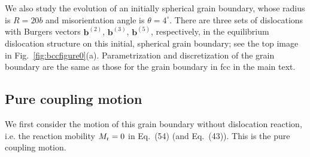 \documentclass[smallextended]{svjour3}
\begin{document}
We also study the evolution of an initially spherical grain boundary, whose radius is $R=20b$ and misorientation angle  is $\theta = 4^\circ $.  There are three sets of dislocations with Burgers vectors $\mathbf b^{(2)}$, $\mathbf{b}^{(3)}$, $\mathbf{b}^{(5)}$, respectively,  in the equilibrium dislocation structure on this initial, spherical grain boundary; see the top image in Fig.~\ref{fig:bccfigure0}(a).
Parametrization and discretization of the grain boundary are the same as those for the grain boundary in fcc in the main text.


%

\subsection{Pure coupling motion} \label{subsec:coupbcc}

We first consider the motion of this grain boundary  without dislocation reaction, i.e. the reaction mobility $M_{\rm r}=0$ in Eq.~(54) (and Eq.~(43)). This is the pure coupling motion.

\end{document}
